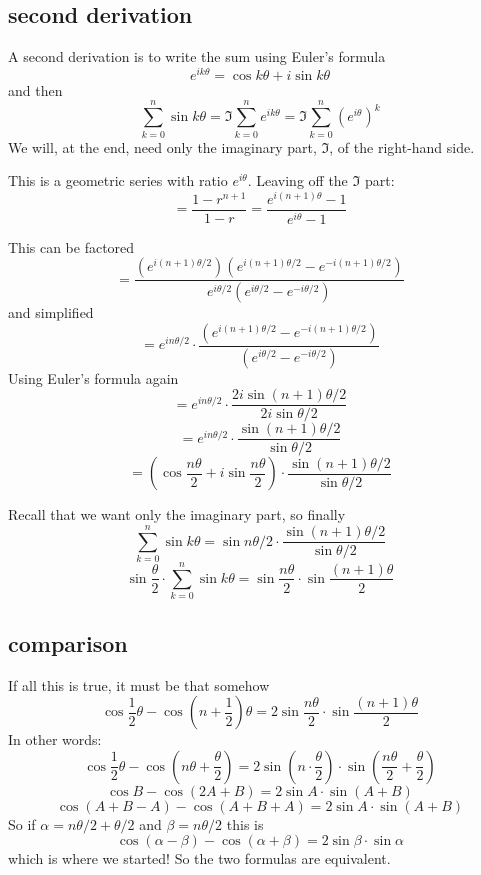\documentclass[11pt, oneside]{article}
\begin{document}
\subsection*{second derivation}

A second derivation is to write the sum using Euler's formula 
\[ e^{ik\theta} = \cos k \theta + i \sin k \theta \]
and then
\[ \sum_{k=0}^n \sin k \theta = \Im {\sum_{k=0}^n e^{ik \theta} } = \Im {\sum_{k=0}^n (e^{i \theta})^k } \]
We will, at the end, need only the imaginary part, $\Im$, of the right-hand side.

This is a geometric series with ratio $e^{i \theta}$.  Leaving off the $\Im$ part:
\[ = \frac{1 - r^{n+1}}{1 - r} = \frac {e^{i(n+1) \theta} - 1} {e^{i \theta} - 1} \]

This can be factored
\[ = \frac {(e^{i(n+1) \theta/2})(e^{i(n+1) \theta/2} - e^{-i(n+1) \theta/2})} {e^{i \theta/2} (e^{i \theta/2} - e^{-i \theta/2})} \]
and simplified
\[ = e^{in \theta/2} \cdot \frac {(e^{i(n+1) \theta/2} - e^{-i(n+1) \theta/2})} {(e^{i \theta/2} - e^{-i \theta/2})} \]
Using Euler's formula again 
\[ = e^{in \theta/2} \cdot \frac {2i \sin (n+1) \theta/2} {2i \sin \theta/2 } \]
\[ = e^{in \theta/2} \cdot \frac {\sin (n+1) \theta/2} {\sin \theta/2 } \]
\[ = (\cos \frac {n \theta} 2 + i \sin \frac {n \theta} 2 ) \cdot \frac {\sin (n+1) \theta/2} {\sin \theta/2 } \]

Recall that we want only the imaginary part, so finally
\[ \sum_{k=0}^n \sin k \theta =  \sin n \theta/2 \cdot \frac {\sin (n+1) \theta/2} {\sin \theta/2 } \]
\[ \sin \frac \theta 2 \cdot \sum_{k=0}^n \sin k \theta =  \sin \frac {n \theta} 2 \cdot \sin \frac {(n+1) \theta} 2  \]

\subsection*{comparison}
If all this is true, it must be that somehow
\[ \cos {\frac 1 2} \theta  - \cos (n +  {\frac 1 2}) \theta =  2 \sin \frac {n \theta} 2 \cdot \sin \frac {(n+1) \theta} 2  \]
In other words:
\[ \cos {\frac 1 2} \theta  - \cos (n \theta +  \frac \theta 2) =  2 \sin (n \cdot \frac \theta 2) \cdot \sin (\frac {n \theta} 2 + \frac \theta 2)  \]
\[ \cos B - \cos (2A + B) = 2 \sin A \cdot \sin (A + B)  \]
\[ \cos (A+B - A) - \cos (A + B + A)  = 2 \sin A \cdot \sin (A + B) \]
So if $\alpha = n \theta/2 + \theta/2$ and $\beta = n \theta/2$ this is
\[ \cos (\alpha - \beta) - \cos (\alpha + \beta) = 2 \sin \beta \cdot \sin \alpha \]
which is where we started!  So the two formulas are equivalent.
\end{document}
